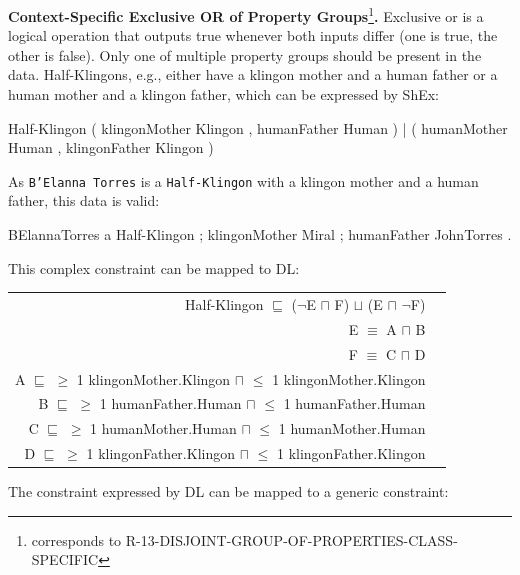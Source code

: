 \documentclass{llncs}
\newcommand{\ms}[1]{\texttt{#1}}
\newenvironment{DL}{
	\begin{center}
  \begin{tabular}{r l}

}{
  \end{tabular}
	\end{center}
}
\begin{document}
\textbf{Context-Specific Exclusive OR of Property Groups}\footnote{corresponds to R-13-DISJOINT-GROUP-OF-PROPERTIES-CLASS-SPECIFIC}\textbf{.}
Exclusive or is a logical operation that outputs true whenever both inputs differ (one is true, the other is false).
Only one of multiple property groups should be present in the data.
Half-Klingons, e.g., either have a klingon mother and a human father or a human mother and a klingon father, which can be expressed by ShEx:

\begin{ex}
Half-Klingon { 
    ( klingonMother Klingon , humanFather Human ) |
    ( humanMother Human , klingonFather Klingon ) }
\end{ex}

As \ms{B'Elanna Torres} is a \ms{Half-Klingon} with a klingon mother and a human father, this data is valid:

\begin{ex}
BElannaTorres a Half-Klingon ;
    klingonMother Miral ; humanFather JohnTorres .
\end{ex}


This complex constraint can be mapped to DL:

\begin{DL}
Half-Klingon $\sqsubseteq$ ($\neg$E $\sqcap$ F) $\sqcup$ (E $\sqcap$ $\neg$F) \\ 
E $\equiv$ A $\sqcap$ B \\
F $\equiv$ C $\sqcap$ D \\
A $\sqsubseteq$ $\geq$ 1 klingonMother.Klingon $\sqcap$ $\leq$ 1 klingonMother.Klingon \\
B $\sqsubseteq$ $\geq$ 1 humanFather.Human $\sqcap$ $\leq$ 1 humanFather.Human \\
C $\sqsubseteq$ $\geq$ 1 humanMother.Human $\sqcap$ $\leq$ 1 humanMother.Human \\
D $\sqsubseteq$ $\geq$ 1 klingonFather.Klingon $\sqcap$ $\leq$ 1 klingonFather.Klingon \\
\end{DL}

The constraint expressed by DL can be mapped to a generic constraint:
\end{document}
